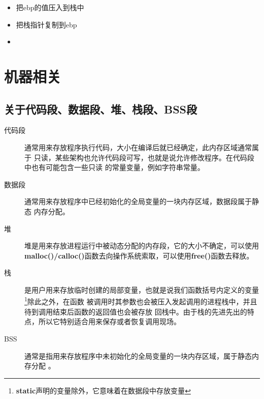\documentclass{article}
\begin{document}
\begin{itemize}
\item[(1)] 把ebp的值压入到栈中
\item[(2)] 把栈指针复制到ebp
\item[(3)] [tbd]
\end{itemize}

\section{机器相关}

\subsection{关于代码段、数据段、堆、栈段、BSS段}
\begin{description}
\item[代码段] 通常用来存放程序执行代码，大小在编译后就已经确定，此内存区域通常属于
只读，某些架构也允许代码段可写，也就是说允许修改程序。在代码段中也有可能包含一些只读
的常量变量，例如字符串常量。
\item[数据段] 通常用来存放程序中已经初始化的全局变量的一块内存区域，数据段属于静态
内存分配。
\item[堆] 堆是用来存放进程运行中被动态分配的内存段，它的大小不确定，可以使用\textbf{
malloc()/calloc()}函数去向操作系统索取，可以使用\textbf{free()}函数去释放。
\item[栈] 是用户用来存放临时创建的局部变量，也就是说我们函数括号内定义的变量
\footnote{\textbf{static}声明的变量除外，它意味着在数据段中存放变量}除此之外，在函数
被调用时其参数也会被压入发起调用的进程栈中，并且待到调用结束后函数的返回值也会被存放
回栈中。由于栈的先进先出的特点，所以它特别适合用来保存或者恢复调用现场。
\item[BSS] 通常是指用来存放程序中未初始化的全局变量的一块内存区域，属于静态内存分配
。
\end{description}
\end{document}
